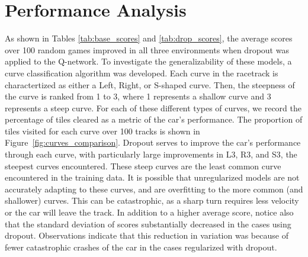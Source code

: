 \documentclass{article}
\begin{document}
\section{Performance Analysis}
As shown in Tables \ref{tab:base_scores} and \ref{tab:drop_scores},
the average scores over 100 random games improved in all three
environments when dropout was applied to the Q-network. To
investigate the generalizability of these models, a curve 
classification algorithm was developed. Each curve in the racetrack is
charactertized as either a Left, Right, or S-shaped curve. Then, the
steepness of the curve is ranked from 1 to 3, where 1 represents a
shallow curve and 3 represents a steep curve. 
For each of these different types of curves, we record the percentage
of tiles cleared as a metric of the car's performance. 
The proportion of tiles visited for each curve over 100 tracks is
shown in Figure~\ref{fig:curves_comparison}. Dropout serves to
improve the car's performance through each curve, with particularly
large improvements in L3, R3, and S3, the steepest curves
encountered. These steep curves are the least common curve encountered
in the training data. It is possible that unregularized models are not
accurately adapting to these curves, and are overfitting to the more
common (and shallower) curves. This can be catastrophic, as a sharp
turn requires less velocity or the car will leave the track. In
addition to a higher average score, notice also that the standard
deviation of scores substantially  decreased in the cases using
dropout. Observations indicate that this reduction in variation was
because of fewer catastrophic crashes of the car in the cases
regularized with dropout.  
\end{document}
